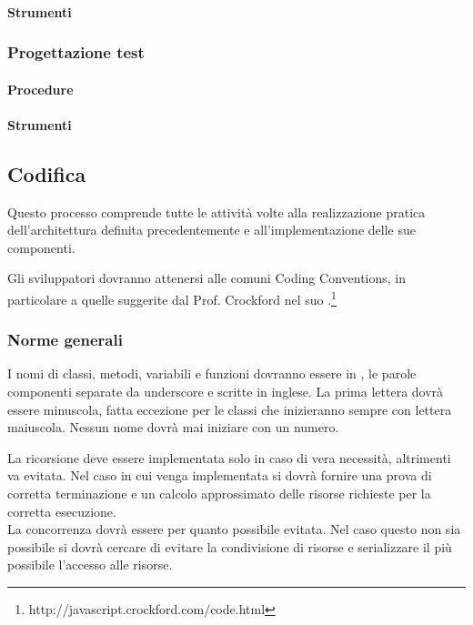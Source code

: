 \paragraph{Strumenti}

\subsubsection{Progettazione test}

\paragraph{Procedure}

\paragraph{Strumenti}





\subsection{Codifica}
Questo processo comprende tutte le attività volte alla realizzazione pratica dell'architettura definita precedentemente e all'implementazione delle sue componenti.

Gli sviluppatori dovranno attenersi alle comuni Coding Conventions, in particolare a quelle suggerite dal Prof. Crockford nel suo .\footnote{http://javascript.crockford.com/code.html}\\

\subsubsection{Norme generali}
\label{}
I nomi di classi, metodi, variabili e funzioni dovranno essere in , le parole componenti separate da underscore e scritte in inglese.
La prima lettera dovrà essere minuscola, fatta eccezione per le classi che inizieranno sempre con lettera maiuscola.
Nessun nome dovrà mai iniziare con un numero.

La ricorsione deve essere implementata solo in caso di vera necessità, altrimenti va evitata. Nel caso in cui venga implementata si dovrà fornire una prova di corretta terminazione e un calcolo approssimato delle risorse richieste per la corretta esecuzione.\\
La concorrenza dovrà essere per quanto possibile evitata. Nel caso questo non sia possibile si dovrà cercare di evitare la condivisione di risorse e serializzare il più possibile l'accesso alle risorse.

